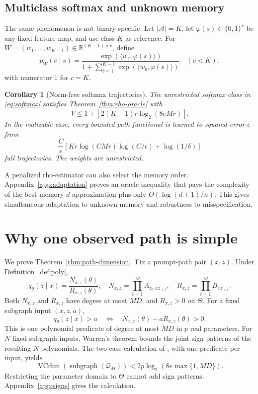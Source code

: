 \documentclass{article}
\newtheorem{corollary}[theorem]{Corollary}
\theoremstyle{definition}
\theoremstyle{remark}
\newcommand{\cA}{\mathcal A}
\newcommand{\cQ}{\mathcal Q}
\begin{document}
\subsection{Multiclass softmax and unknown memory}

The same phenomenon is not binary-specific. Let $|\cA|=K$, let $\varphi(s)\in\{0,1\}^r$ be any fixed feature map, and use class $K$ as reference. For $W=(w_1,\ldots,w_{K-1})\in\mathbb R^{(K-1)\times r}$, define
\begin{equation}
\label{eq:softmax}
p_W(c\mid s)=\frac{\exp(\langle w_c,\varphi(s)\rangle)}{1+\sum_{b=1}^{K-1}\exp(\langle w_b,\varphi(s)\rangle)}
\quad(c<K),
\end{equation}
with numerator $1$ for $c=K$.

\begin{corollary}[Norm-free softmax trajectories]
\label{cor:softmax}
The unrestricted softmax class in \eqref{eq:softmax} satisfies Theorem~\ref{thm:rho-oracle} with \[ V\le1+\left\lceil2(K-1)r\log_2(8eMr)\right\rceil. \] In the realizable case, every bounded path functional is learned to squared error $\epsilon$ from \[ \frac{C}{\epsilon}\left[Kr\log(CMr)\log(C/\epsilon)+\log(1/\delta)\right] \] full trajectories. The weights are unrestricted.
\end{corollary}

A penalized rho-estimator can also select the memory order. Appendix~\ref{app:adaptation} proves an oracle inequality that pays the complexity of the best memory-$d$ approximation plus only $O(\log(d+1)/n)$. This gives simultaneous adaptation to unknown memory and robustness to misspecification.

\section{Why one observed path is simple}
\label{sec:path-proof}

We prove Theorem~\ref{thm:path-dimension}. Fix a prompt-path pair $(x,z)$. Under Definition~\ref{def:poly}, \[ q_\theta(z\mid x)=\frac{N_{x,z}(\theta)}{R_{x,z}(\theta)}, \quad N_{x,z}=\prod_{t=1}^M A_{z_t,xz_{<t}}, \quad R_{x,z}=\prod_{t=1}^M B_{xz_{<t}}. \] Both $N_{x,z}$ and $R_{x,z}$ have degree at most $MD$, and $R_{x,z}>0$ on $\Theta$. For a fixed subgraph input $(x,z,a)$,
\begin{equation}
\label{eq:subgraph-poly}
q_\theta(z\mid x)>a
\quad\Longleftrightarrow\quad
N_{x,z}(\theta)-aR_{x,z}(\theta)>0.
\end{equation}
This is one polynomial predicate of degree at most $MD$ in $p$ real parameters. For $N$ fixed subgraph inputs, Warren's theorem bounds the joint sign patterns of the resulting $N$ polynomials. The two-case calculation of \citet{goldberg1995bounding}, with one predicate per input, yields \[ \operatorname{VCdim}(\operatorname{subgraph}(\cQ_M)) <2p\log_2(8e\max\{1,MD\}). \] Restricting the parameter domain to $\Theta$ cannot add sign patterns. Appendix~\ref{app:signs} gives the calculation.
\end{document}
